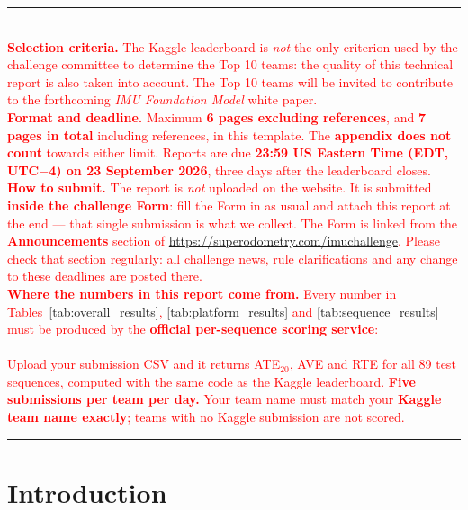 \documentclass[letterpaper,10pt,conference]{ieeeconf}
\begin{document}
\vspace{0.5em}
\noindent\textcolor{red}{\rule{\columnwidth}{0.4pt}}\\[-0.3em]
\noindent\textcolor{red}{\textbf{Selection criteria.} The Kaggle leaderboard is \emph{not} the
only criterion used by the challenge committee to determine the Top 10 teams: the quality of
this technical report is also taken into account. The Top 10 teams will be invited to
contribute to the forthcoming \emph{IMU Foundation Model} white paper.}\\[-0.2em]
\noindent\textcolor{red}{\textbf{Format and deadline.} Maximum \textbf{6 pages excluding
references}, and \textbf{7 pages in total} including references, in this template. The
\textbf{appendix does not count} towards either limit. Reports are due
\textbf{23:59 US Eastern Time (EDT, UTC$-$4) on 23 September 2026}, three days after the
leaderboard closes.}\\[-0.2em]
\noindent\textcolor{red}{\textbf{How to submit.} The report is \emph{not} uploaded on the
website. It is submitted \textbf{inside the challenge Form}: fill the Form in as usual and
attach this report at the end --- that single submission is what we collect.
The Form is linked from the \textbf{Announcements} section of
\url{https://superodometry.com/imuchallenge}. Please check that section regularly: all
challenge news, rule clarifications and any change to these deadlines are posted there.}\\[-0.2em]
\noindent\textcolor{red}{\textbf{Where the numbers in this report come from.} Every number in
Tables~\ref{tab:overall_results}, \ref{tab:platform_results} and \ref{tab:sequence_results}
must be produced by the \textbf{official per-sequence scoring service}:\\[0.15em]
\scoringurl\\[0.15em]
Upload your submission CSV and it returns ATE$_{20}$, AVE and RTE for all 89 test sequences,
computed with the same code as the Kaggle leaderboard. \textbf{Five submissions per team per
day.} Your team name must match your \textbf{Kaggle team name exactly}; teams with no Kaggle
submission are not scored.}\\[-0.2em]
\noindent\textcolor{red}{\rule{\columnwidth}{0.4pt}}
\vspace{0.5em}

\section{Introduction}
\end{document}
